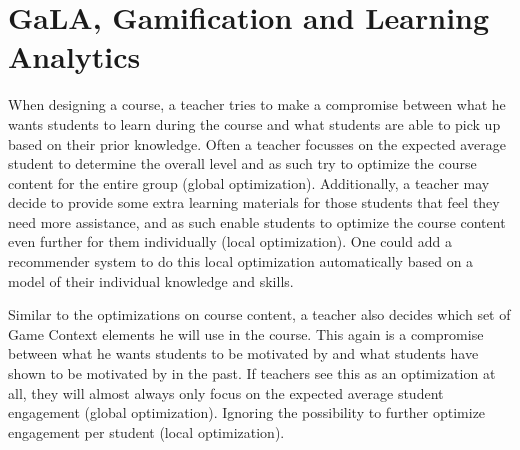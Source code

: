 \documentclass[11pt]{article}
\begin{document}
\section{GaLA, Gamification and Learning Analytics}
When designing a course, a teacher tries to make a compromise between what he wants students to learn during the course and what students are able to pick up based on their prior knowledge. Often a teacher focusses on the expected average student to determine the overall level and as such try to optimize the course content for the entire group (global optimization). Additionally, a teacher may decide to provide some extra learning materials for those students that feel they need more assistance, and as such enable students to optimize the course content even further for them individually (local optimization). One could add a recommender system to do this local optimization automatically based on a model of their individual knowledge and skills.

Similar to the optimizations on course content, a teacher also decides which set of Game Context elements he will use in the course. This again is a compromise between what he wants students to be motivated by and what students have shown to be motivated by in the past. If teachers see this as an optimization at all, they will almost always only focus on the expected average student engagement (global optimization). Ignoring the possibility to further optimize engagement per student (local optimization).
\end{document}
